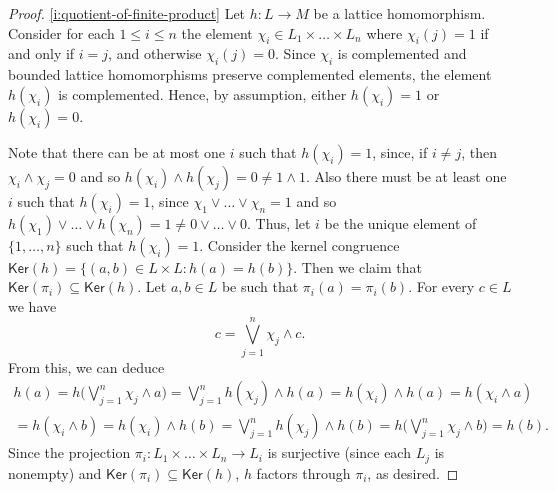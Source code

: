 \documentclass[12pt]{amsart}
\theoremstyle{plain}
\theoremstyle{definition}
\begin{document}
\begin{proof}
    \eqref{i:quotient-of-finite-product}
    Let $h\colon L\rightarrow M$ be a lattice homomorphism.  Consider for each $1\leq i\leq n$ the element $\chi_{i}\in L_{1}\times\dots\times L_{n}$ where $\chi_{i}(j)=1$ if and only if $i=j$, and otherwise $\chi_{i}(j)=0$. Since $\chi_{i}$ is complemented and bounded lattice homomorphisms preserve complemented elements, the element $h(\chi_{i})$ is complemented. Hence, by assumption, either $h(\chi_{i})=1$ or $h(\chi_{i})=0$.

    Note that there can be at most one $i$ such that $h(\chi_{i})=1$, since, if $i\neq j$, then $\chi_{i}\wedge\chi_{j}=0$ and so $h(\chi_{i}) \wedge h(\chi_{j})=0 \neq 1 \wedge 1$. Also there must be at least one $i$ such that $h(\chi_{i})=1$, since $\chi_{1}\vee\dots\vee \chi_{n}=1$ and so $h(\chi_{1})\vee\dots\vee h(\chi_{n}) = 1 \neq 0 \lor \dots \lor 0$. Thus, let $i$ be the unique element of $\{1, \dots, n\}$ such that $h(\chi_{i})=1$.    Consider the kernel congruence $\mathsf{Ker}(h)=\{(a,b)\in L\times L : h(a)=h(b)\}$. Then we claim that $ \mathsf{Ker}(\pi_{i})\subseteq \mathsf{Ker}(h)$.
    Let $a, b \in L$ be such that $\pi_i(a) = \pi_i(b)$.
    For every $c \in L$ we have
    \[
    c = \bigvee_{j = 1}^n \chi_j \land c.
    \]
    From this, we can deduce
    \begin{gather*}
        h(a) = h\biggl(\bigvee_{j = 1}^n \chi_j \land a\biggr)   = \bigvee_{j = 1}^n h(\chi_j) \land h(a)= h(\chi_i) \land h(a)    = h(\chi_i \land a) \\
        = h(\chi_i \land b)= h(\chi_i) \land h(b) = \bigvee_{j = 1}^n h(\chi_j) \land h(b)= h\biggl(\bigvee_{j = 1}^n \chi_j \land b\biggr)= h(b).
    \end{gather*}
    Since the projection $\pi_{i} \colon L_1 \times \dots \times L_n \to L_i$ is surjective (since each $L_j$ is nonempty) and $\mathsf{Ker}(\pi_{i})\subseteq\mathsf{Ker}(h)$, $h$ factors through $\pi_{i}$, as desired.



\end{proof}
\end{document}
